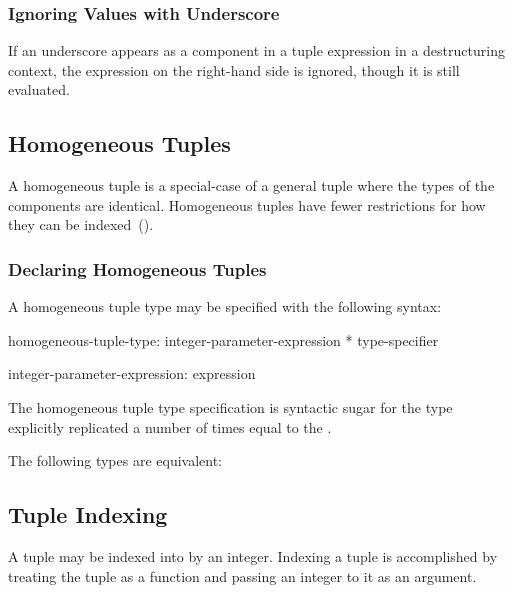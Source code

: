 \subsubsection{Ignoring Values with Underscore}
\label{Ignoring_Values_with_Underscore}

If an underscore appears as a component in a tuple expression in a
destructuring context, the expression on the right-hand side is
ignored, though it is still evaluated.

\subsection{Homogeneous Tuples}
\label{Homogeneous_Tuples}

A homogeneous tuple is a special-case of a general tuple where the
types of the components are identical.  Homogeneous tuples have fewer
restrictions for how they can be indexed~().

\subsubsection{Declaring Homogeneous Tuples}
\label{Declaring_Homogeneous_Tuples}


A homogeneous tuple type may be specified with the following syntax:
\begin{syntax}
homogeneous-tuple-type:
  integer-parameter-expression * type-specifier

integer-parameter-expression:
  expression
\end{syntax}
The homogeneous tuple type specification is syntactic sugar for the
type explicitly replicated a number of times equal to the
.
\begin{example}
The following types are equivalent:
\begin{center}
 \hspace{2pc} 
\end{center}
\end{example}

\subsection{Tuple Indexing}
\label{Tuple_Indexing}

A tuple may be indexed into by an integer.  Indexing a tuple is
accomplished by treating the tuple as a function and passing an
integer to it as an argument.

